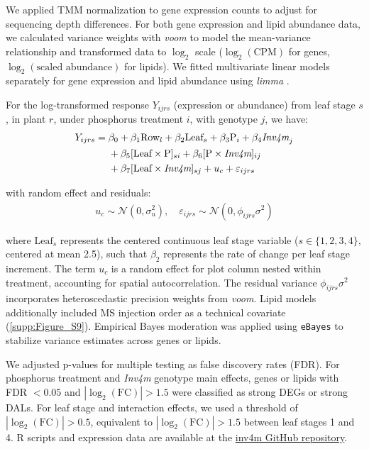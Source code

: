 \documentclass[9pt,twocolumn,twoside]{rilabRxiv}
\newcommand{\invfour}{\textit{Inv4m}\xspace}
\begin{document}
We applied TMM normalization to gene expression counts to adjust for sequencing depth differences.
For both gene expression and lipid abundance data, we calculated variance weights with \textit{voom} \cite{law2014} to model the mean-variance relationship and transformed data to $\log_2$ scale ($\log_2(\text{CPM})$ for genes, $\log_2(\text{scaled abundance})$ for lipids).
We fitted multivariate linear models separately for gene expression and lipid abundance using \textit{limma} \cite{ritchie2015}.

For the log-transformed response $Y_{ijrs}$ (expression or abundance) from leaf stage $s$, in plant $r$, under phosphorus treatment $i$, with genotype $j$, we have:
\begin{eqnarray}
\begin{aligned}
Y_{ijrs} = {}& \beta_0 + \beta_1 \text{Row}_l + \beta_2 \text{Leaf}_s
+ \beta_3 \text{P}_i + \beta_4 \textit{\invfour}_j \\ 
& + \beta_5 [\text{Leaf} \times \text{P}]_{si} 
+ \beta_6 [\text{P} \times \textit{\invfour}]_{ij} \\ 
& + \beta_7 [\text{Leaf} \times \textit{\invfour}]_{sj} 
+ u_c + \varepsilon_{ijrs}
\end{aligned}
\end{eqnarray}

with random effect and residuals:
\begin{eqnarray}
u_c \sim \mathcal{N}(0, \sigma^2_u), \quad \varepsilon_{ijrs} \sim \mathcal{N}(0, \phi_{ijrs}\sigma^2)
\end{eqnarray}

where $\text{Leaf}_s$ represents the centered continuous leaf stage variable ($s \in \{1,2,3,4\}$, centered at mean 2.5), such that $\beta_2$ represents the rate of change per leaf stage increment.
The term $u_c$ is a random effect for plot column nested within treatment, accounting for spatial autocorrelation.
The residual variance $\phi_{ijrs}\sigma^2$ incorporates heteroscedastic precision weights from \textit{voom}.
Lipid models additionally included MS injection order as a technical covariate (\ref{supp:Figure_S9}).
Empirical Bayes moderation was applied using \texttt{eBayes} to stabilize variance estimates across genes or lipids.

We adjusted p-values for multiple testing as false discovery rates (FDR).
For phosphorus treatment and \invfour genotype main effects, genes or lipids with FDR $< 0.05$ and $|\log_2(\text{FC})| > 1.5$ were classified as strong DEGs or strong DALs.
For leaf stage and interaction effects, we used a threshold of $|\log_2(\text{FC})| > 0.5$, equivalent to $|\log_2(\text{FC})| > 1.5$ between leaf stages 1 and 4.
R scripts and expression data are available at the \href{https://github.com/sawers-rellan-labs/inv4m}{inv4m GitHub repository}.
\end{document}
